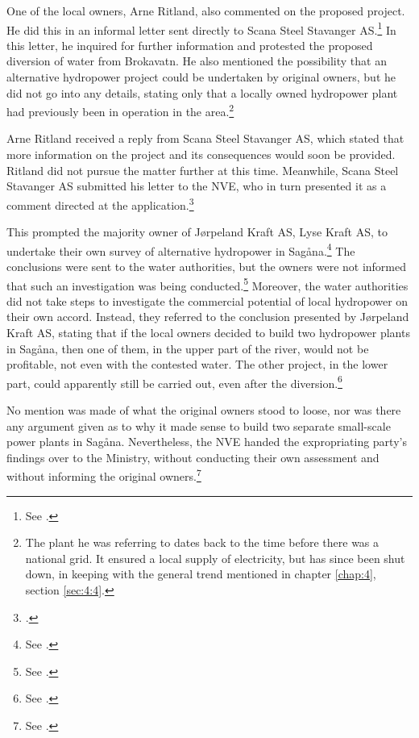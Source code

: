 One of the local owners, Arne Ritland, also commented on the proposed project. He did this in an informal letter sent directly to Scana Steel Stavanger AS.\footnote{See \cite[17]{jorpeland09}.} In this letter, he inquired for further information and protested the proposed diversion of water from Brokavatn. He also mentioned the possibility that an alternative hydropower project could be undertaken by original owners, but he did not go into any details, stating only that a locally owned hydropower plant had previously been in operation in the area.\footnote{The plant he was referring to dates back to the time before there was a national grid. It ensured a local supply of electricity, but has since been shut down, in keeping with the general trend mentioned in chapter \ref{chap:4}, section \ref{sec:4:4}.}

Arne Ritland received a reply from Scana Steel Stavanger AS, which stated that more information on the project and its consequences would soon be provided. Ritland did not pursue the matter further at this time. Meanwhile, Scana Steel Stavanger AS submitted his letter to the NVE, who in turn presented it as a comment directed at the application.\footnote{\cite[18]{jorpeland09}.}

This prompted the majority owner of Jørpeland Kraft AS, Lyse Kraft AS, to undertake their own survey of alternative hydropower in Sagåna.\footnote{See \cite[19]{jorpeland09}.} The conclusions were sent to the water authorities, but the owners were not informed that such an investigation was being conducted.\footnote{See \cite[23]{jorpeland09}.} Moreover, the water authorities did not take steps to investigate the commercial potential of local hydropower on their own accord. Instead, they referred to the conclusion presented by Jørpeland Kraft AS, stating that if the local owners decided to build two hydropower plants in Sagåna, then one of them, in the upper part of the river, would not be profitable, not even with the contested water. The other project, in the lower part, could apparently still be carried out, even after the diversion.\footnote{See \cite[23]{jorpeland09}.}

No mention was made of what the original owners stood to loose, nor was there any argument given as to why it made sense to build two separate small-scale power plants in Sagåna. Nevertheless, the NVE handed the expropriating party's findings over to the Ministry, without conducting their own assessment and without informing the original owners.\footnote{See \cite[22-23]{jorpeland09}.}

